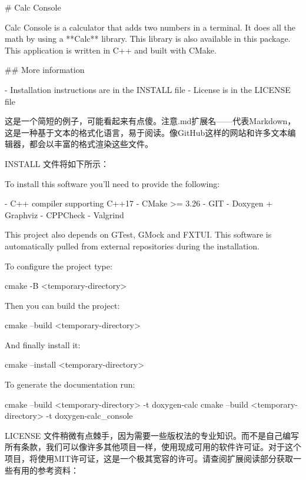
\begin{shell}
# Calc Console

Calc Console is a calculator that adds two numbers in a
terminal. It does all the math by using a **Calc** library.
This library is also available in this package.
This application is written in C++ and built with CMake.

## More information

- Installation instructions are in the INSTALL file
- License is in the LICENSE file
\end{shell}

这是一个简短的例子，可能看起来有点傻。注意.md扩展名——代表Markdown，这是一种基于文本的格式化语言，易于阅读。像GitHub这样的网站和许多文本编辑器，都会以丰富的格式渲染这些文件。

INSTALL 文件将如下所示：


\begin{shell}
To install this software you'll need to provide the following:

- C++ compiler supporting C++17
- CMake >= 3.26
- GIT
- Doxygen + Graphviz
- CPPCheck
- Valgrind

This project also depends on GTest, GMock and FXTUI. This
software is automatically pulled from external repositories
during the installation.

To configure the project type:

cmake -B <temporary-directory>

Then you can build the project:

cmake --build <temporary-directory>

And finally install it:

cmake --install <temporary-directory>

To generate the documentation run:

cmake --build <temporary-directory> -t doxygen-calc
cmake --build <temporary-directory> -t doxygen-calc_console
\end{shell}

LICENSE 文件稍微有点棘手，因为需要一些版权法的专业知识。而不是自己编写所有条款，我们可以像许多其他项目一样，使用现成可用的软件许可证。对于这个项目，将使用MIT许可证，这是一个极其宽容的许可。请查阅扩展阅读部分获取一些有用的参考资料：


